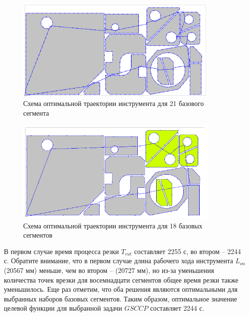\documentclass[11pt,twoside,openany]{report}
\begin{document}
\begin{figure}[h]
  \begin{center}
  \includegraphics[width=0.9\textwidth]{path21.png}
  \caption{
    Схема оптимальной траектории инструмента
    для 21 базового сегмента
    }
  \label{path21}
  \end{center}
\end{figure}

\begin{figure}[h]
  \begin{center}
  \includegraphics[width=0.9\textwidth]{path18.png}
  \caption{
    Схема оптимальной траектории инструмента
    для 18 базовых сегментов
    }
  \label{path18}
  \end{center}
\end{figure}

В первом случае время процесса резки
$T_{cut}$
составляет 2255 с,
во втором -- 2244 с.
Обратите внимание, что в первом случае длина рабочего хода инструмента
$L_{on}$
(20567 мм) меньше, чем во втором -- (20727 мм),
но из-за уменьшения количества точек врезки
для восемнадцати сегментов общее время резки также уменьшилось.
Еще раз отметим, что оба решения являются оптимальными
для выбранных наборов базовых сегментов.
Таким образом, оптимальное значение целевой
функции для выбранной задачи $GSCCP$ составляет 2244 с.
\end{document}
